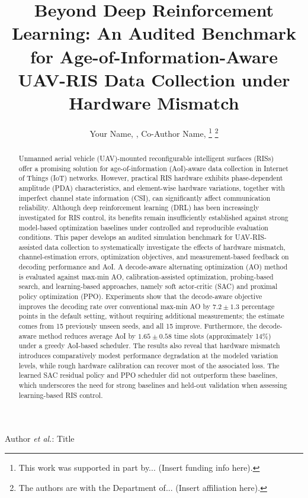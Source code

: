 \documentclass[journal]{IEEEtran}
\begin{document}
\title{Beyond Deep Reinforcement Learning: An Audited Benchmark for Age-of-Information-Aware UAV-RIS Data Collection under Hardware Mismatch}

\author{Your Name, , Co-Author Name, 
\thanks{This work was supported in part by... (Insert funding info here).}
\thanks{The authors are with the Department of... (Insert affiliation here).}}

%
{Author \MakeLowercase{\textit{et al.}}: Title}

\maketitle

\begin{abstract}
Unmanned aerial vehicle (UAV)-mounted reconfigurable intelligent surfaces (RISs) offer a promising solution for age-of-information (AoI)-aware data collection in Internet of Things (IoT) networks. However, practical RIS hardware exhibits phase-dependent amplitude (PDA) characteristics, and element-wise hardware variations, together with imperfect channel state information (CSI), can significantly affect communication reliability. Although deep reinforcement learning (DRL) has been increasingly investigated for RIS control, its benefits remain insufficiently established against strong model-based optimization baselines under controlled and reproducible evaluation conditions. This paper develops an audited simulation benchmark for UAV-RIS-assisted data collection to systematically investigate the effects of hardware mismatch, channel-estimation errors, optimization objectives, and measurement-based feedback on decoding performance and AoI. A decode-aware alternating optimization (AO) method is evaluated against max-min AO, calibration-assisted optimization, probing-based search, and learning-based approaches, namely soft actor-critic (SAC) and proximal policy optimization (PPO). Experiments show that the decode-aware objective improves the decoding rate over conventional max-min AO by $7.2\pm1.3$ percentage points in the default setting, without requiring additional measurements; the estimate comes from 15 previously unseen seeds, and all 15 improve. Furthermore, the decode-aware method reduces average AoI by $1.65\pm0.58$ time slots (approximately 14\%) under a greedy AoI-based scheduler. The results also reveal that hardware mismatch introduces comparatively modest performance degradation at the modeled variation levels, while rough hardware calibration can recover most of the associated loss. The learned SAC residual policy and PPO scheduler did not outperform these baselines, which underscores the need for strong baselines and held-out validation when assessing learning-based RIS control.
\end{abstract}
\end{document}
